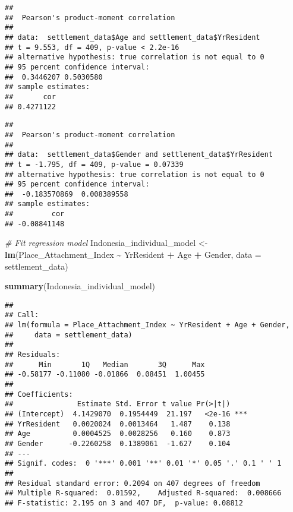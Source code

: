 \documentclass[
]{article}
\newenvironment{Shaded}{\begin{snugshade}}{\end{snugshade}}
\newcommand{\AttributeTok}[1]{\textcolor[rgb]{0.13,0.29,0.53}{#1}}
\newcommand{\CommentTok}[1]{\textcolor[rgb]{0.56,0.35,0.01}{\textit{#1}}}
\newcommand{\FunctionTok}[1]{\textcolor[rgb]{0.13,0.29,0.53}{\textbf{#1}}}
\newcommand{\NormalTok}[1]{#1}
\newcommand{\OtherTok}[1]{\textcolor[rgb]{0.56,0.35,0.01}{#1}}
\newcommand{\SpecialCharTok}[1]{\textcolor[rgb]{0.81,0.36,0.00}{\textbf{#1}}}
\begin{document}
\begin{verbatim}
## 
##  Pearson's product-moment correlation
## 
## data:  settlement_data$Age and settlement_data$YrResident
## t = 9.553, df = 409, p-value < 2.2e-16
## alternative hypothesis: true correlation is not equal to 0
## 95 percent confidence interval:
##  0.3446207 0.5030580
## sample estimates:
##       cor 
## 0.4271122
\end{verbatim}

\begin{Shaded}
\end{Shaded}

\begin{verbatim}
## 
##  Pearson's product-moment correlation
## 
## data:  settlement_data$Gender and settlement_data$YrResident
## t = -1.795, df = 409, p-value = 0.07339
## alternative hypothesis: true correlation is not equal to 0
## 95 percent confidence interval:
##  -0.183570869  0.008389558
## sample estimates:
##         cor 
## -0.08841148
\end{verbatim}

\begin{Shaded}
\begin{Highlighting}[]
\CommentTok{\# Fit regression model}
\NormalTok{Indonesia\_individual\_model }\OtherTok{\textless{}{-}} \FunctionTok{lm}\NormalTok{(Place\_Attachment\_Index }\SpecialCharTok{\textasciitilde{}}\NormalTok{ YrResident }\SpecialCharTok{+}
\NormalTok{                                   Age }\SpecialCharTok{+}\NormalTok{ Gender, }\AttributeTok{data =}\NormalTok{ settlement\_data)}


\FunctionTok{summary}\NormalTok{(Indonesia\_individual\_model)}
\end{Highlighting}
\end{Shaded}

\begin{verbatim}
## 
## Call:
## lm(formula = Place_Attachment_Index ~ YrResident + Age + Gender, 
##     data = settlement_data)
## 
## Residuals:
##      Min       1Q   Median       3Q      Max 
## -0.58177 -0.11080 -0.01866  0.08451  1.00455 
## 
## Coefficients:
##               Estimate Std. Error t value Pr(>|t|)    
## (Intercept)  4.1429070  0.1954449  21.197   <2e-16 ***
## YrResident   0.0020024  0.0013464   1.487    0.138    
## Age          0.0004525  0.0028256   0.160    0.873    
## Gender      -0.2260258  0.1389061  -1.627    0.104    
## ---
## Signif. codes:  0 '***' 0.001 '**' 0.01 '*' 0.05 '.' 0.1 ' ' 1
## 
## Residual standard error: 0.2094 on 407 degrees of freedom
## Multiple R-squared:  0.01592,    Adjusted R-squared:  0.008666 
## F-statistic: 2.195 on 3 and 407 DF,  p-value: 0.08812
\end{verbatim}
\end{document}
